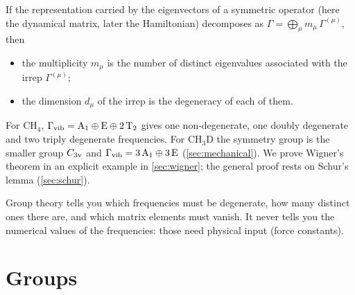 \begin{keyresult}
If the representation carried by the eigenvectors of a symmetric operator (here
the dynamical matrix, later the Hamiltonian) decomposes as
$\Gamma=\bigoplus_\mu m_\mu\,\Gamma^{(\mu)}$, then
\begin{itemize}
\item the multiplicity $m_\mu$ is the number of distinct eigenvalues
      associated with the irrep $\Gamma^{(\mu)}$;
\item the dimension $d_\mu$ of the irrep is the degeneracy of each of them.
\end{itemize}
\end{keyresult}
For $\mathrm{CH_4}$, $\Gamma_{\mathrm{vib}}=\mathrm{A}_1\oplus\mathrm{E}\oplus2\,\mathrm{T}_2$ gives one
non-degenerate, one doubly degenerate and two triply degenerate frequencies. For
$\mathrm{CH_3D}$ the symmetry group is the smaller group $C_{3\mathrm{v}}$ and
$\Gamma_{\mathrm{vib}}=3\,\mathrm{A}_1\oplus3\,\mathrm{E}$ (\cref{sec:mechanical}). We prove Wigner's
theorem in an explicit example in \cref{sec:wigner}; the general proof rests on
Schur's lemma (\cref{sec:schur}).

\begin{remark}
Group theory tells you which frequencies must be degenerate, how many distinct ones
there are, and which matrix elements must vanish. It never tells you the numerical
values of the frequencies: those need physical input (force constants).
\end{remark}

\section{Groups}\label{sec:groups}

